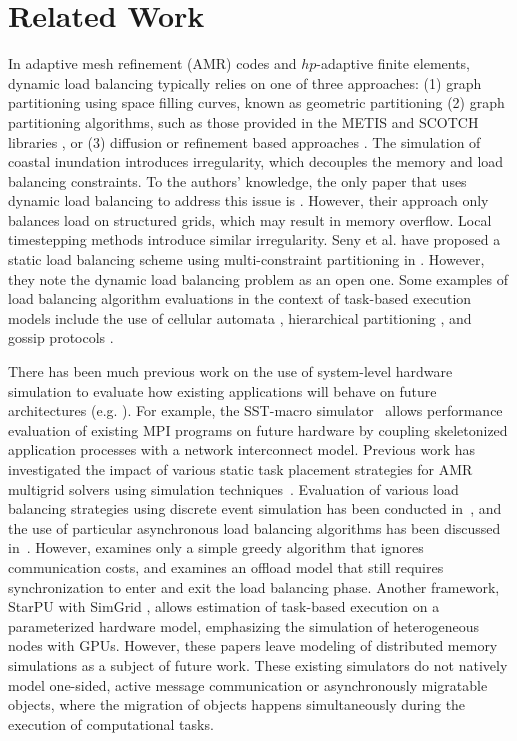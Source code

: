 \section{Related Work}
\label{sec:related}

In adaptive mesh refinement (AMR) codes and $hp$-adaptive finite elements, dynamic load balancing typically relies on one of three approaches: (1) graph partitioning using space filling curves, known as geometric partitioning \cite{Devine2005,Burstedde2011,Blaise2012,Ferreira2017} (2) graph partitioning algorithms, such as those provided in the METIS and SCOTCH libraries \cite{Bhatele2012,scotch,Karypis1998,Devine2005,Aykanat2007}, or (3) diffusion or refinement based approaches \cite{Schloegel1997}.
The simulation of coastal inundation introduces irregularity, which decouples the memory and load balancing constraints.
To the authors' knowledge, the only paper that uses dynamic load balancing to address this issue is \cite{Asuncion2016}. However, their approach only balances load on structured grids, which may result in memory overflow.
Local timestepping methods introduce similar irregularity.
Seny et al. have proposed a static load balancing scheme using multi-constraint partitioning in \cite{Seny2014}.
However, they note the dynamic load balancing problem as an open one.
Some examples of load balancing algorithm evaluations in the context of task-based execution models include the use of cellular automata \cite{Hosoori2011}, hierarchical partitioning \cite{Zheng2010}, and gossip protocols \cite{Menon2013}.

There has been much previous work on the use of system-level hardware simulation to evaluate how existing applications will behave on future architectures (e.g. \cite{Janssen2011,Mubarak2014,Zhang2016,Jain2016,Barrett2012}).
For example, the SST-macro simulator~\cite{janssen2010} allows performance evaluation of existing MPI programs on future hardware by coupling skeletonized application processes with a network interconnect model.
Previous work has investigated the impact of various static task placement strategies for AMR multigrid solvers using simulation techniques~\cite{Chan2016}.
Evaluation of various load balancing strategies using discrete event simulation has been conducted in~\cite{Zheng2005}, and the use of particular asynchronous load balancing algorithms has been discussed in~\cite{Zheng2006,Pearce2016}.
However, \cite{Zheng2006} examines only a simple greedy algorithm that ignores communication costs, and \cite{Pearce2016} examines an offload model that still requires synchronization to enter and exit the load balancing phase.
Another framework, StarPU with SimGrid \cite{Stanisic2015,Stanisic2015b}, allows estimation of task-based execution on a parameterized hardware model, emphasizing the simulation of heterogeneous nodes with GPUs. However, these papers leave modeling of distributed memory simulations as a subject of future work.
These existing simulators do not natively model one-sided, active message communication or asynchronously migratable objects, where the migration of objects happens simultaneously during the execution of computational tasks.

